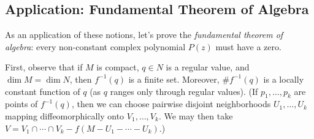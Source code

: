 \subsection{Application: Fundamental Theorem of Algebra}

As an application of these notions, let's prove the \emph{fundamental theorem of algebra}: every non-constant complex polynomial $P(z)$ must have a zero.

First, observe that if $M$ is compact, $q \in N$ is a regular value, and $\dim M = \dim N$, then $f^{-1}(q)$ is a finite set. Moreover, $\# f^{-1}(q)$ is a locally constant function of $q$ (as $q$ ranges only through regular values). (If $p_1, \ldots, p_k$ are points of $f^{-1}(q)$, then we can choose pairwise disjoint neighborhoods $U_1, \ldots, U_k$ mapping diffeomorphically onto $V_1, \ldots, V_k$. We may then take $V = V_1 \cap \cdots \cap V_k - f(M - U_1 - \cdots - U_k)$.)

